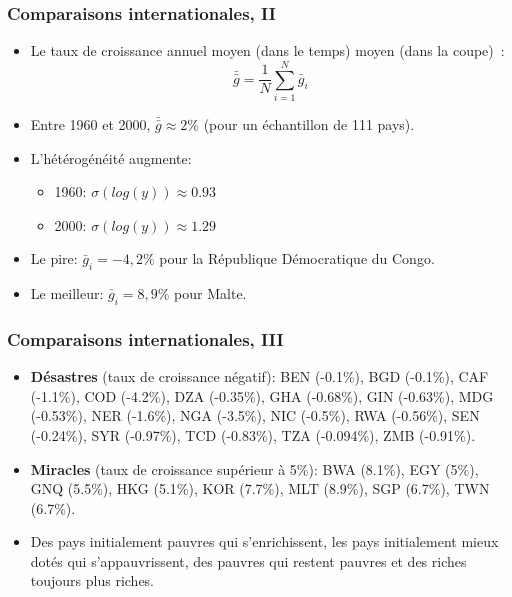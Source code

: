 \documentclass[10pt,notheorems]{beamer}
\theoremstyle{plain}
\theoremstyle{definition} %
\begin{document}
\begin{frame}
  \frametitle{Comparaisons internationales, II}

  \bigskip

  \begin{itemize}

  \item Le taux de croissance annuel moyen (dans le temps) moyen (dans la coupe)~:
    \[
      \bar{\bar g} = \frac{1}{N}\sum_{i=1}^{N} \bar g_{i}
    \]

  \item Entre 1960 et 2000, $\bar{\bar g} \approx 2\%$ (pour un échantillon de 111 pays).\newline

  \item L'hétérogénéité augmente:
    \begin{itemize}
    \item 1960: $\sigma (log(y)) \approx 0.93$
    \item 2000: $\sigma (log(y)) \approx 1.29$
    \end{itemize}

    \bigskip

  \item Le pire: $\bar g_{i} = -4,2\%$ pour la République Démocratique du Congo.\newline

  \item Le meilleur: $\bar g_{i} = 8,9\%$ pour Malte.\newline

  \end{itemize}

\end{frame}


\begin{frame}
  \frametitle{Comparaisons internationales, III}

  \bigskip

  \begin{itemize}

  \item \textbf{Désastres} (taux de croissance négatif): BEN (-0.1\%), BGD (-0.1\%), CAF (-1.1\%), COD (-4.2\%), DZA (-0.35\%), GHA (-0.68\%), GIN (-0.63\%), MDG (-0.53\%), NER (-1.6\%), NGA (-3.5\%), NIC (-0.5\%), RWA (-0.56\%), SEN (-0.24\%), SYR (-0.97\%), TCD (-0.83\%), TZA (-0.094\%), ZMB (-0.91\%).\newline

  \item \textbf{Miracles} (taux de croissance supérieur à 5\%): BWA (8.1\%), EGY (5\%), GNQ (5.5\%), HKG (5.1\%), KOR (7.7\%), MLT (8.9\%), SGP (6.7\%), TWN (6.7\%).\newline

  \item Des pays initialement pauvres qui s'enrichissent, les pays initialement mieux dotés qui s'appauvrissent, des pauvres qui restent pauvres et des riches toujours plus riches.

  \end{itemize}

\end{frame}
\end{document}
